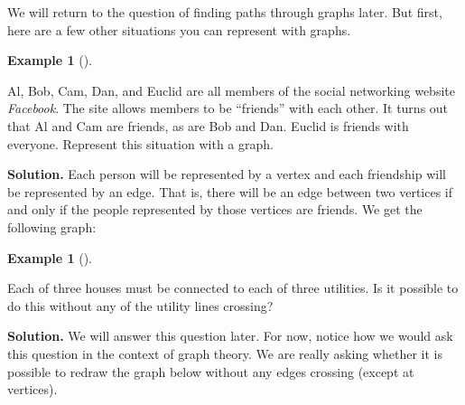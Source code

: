 \documentclass[10pt,]{book}
\theoremstyle{plain}
\theoremstyle{definition}
\newtheorem{example}[theorem]{Example}
\theoremstyle{definition}
\theoremstyle{definition}
\numberwithin{equation}{chapter}
\newcommand{\vtx}[2]{node[fill,circle,inner sep=0pt, minimum size=4pt,label=#1:#2]{}}
\newcommand{\vb}[1]{\vtx{below}{#1}}
\newcommand{\vr}[1]{\vtx{right}{#1}}
\newcommand{\vl}[1]{\vtx{left}{#1}}
\renewcommand{\v}{\vtx{above}{}}
\begin{document}
We will return to the question of finding paths through graphs later. But first, here are a few other situations you can represent with graphs.
%
\begin{example}[]\label{example-99}

Al, Bob, Cam, Dan, and Euclid are all members of the social networking website \emph{Facebook}. The site allows members to be ``friends'' with each other. It turns out that Al and Cam are friends, as are Bob and Dan. Euclid is friends with everyone. Represent this situation with a graph.
%
\par\medskip\noindent%
\textbf{Solution.}\quad
Each person will be represented by a vertex and each friendship will be represented by an edge. That is, there will be an edge between two vertices if and only if the people represented by those vertices are friends. We get the following graph:
%
\leavevmode%
\begin{figure}
\centering
{
}
\end{figure}
\end{example}
\begin{example}[]\label{example-100}

Each of three houses must be connected to each of three utilities. Is it possible to do this without any of the utility lines crossing?
%
\par\medskip\noindent%
\textbf{Solution.}\quad
We will answer this question later. For now, notice how we would ask this question in the context of graph theory. We are really asking whether it is possible to redraw the graph below without any edges crossing (except at vertices).
%

{
}

\end{example}
\typeout{************************************************}
\typeout{************************************************}
\end{document}
